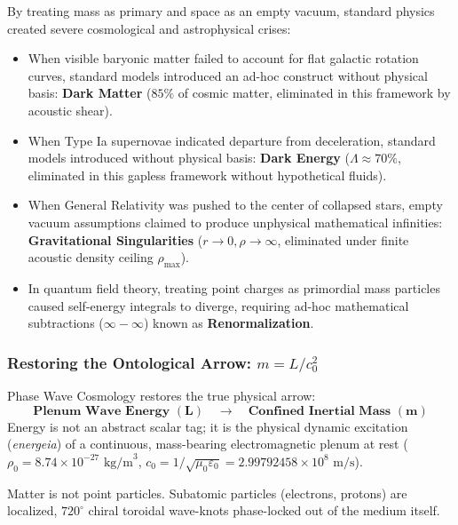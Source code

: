 \documentclass[11pt,a4paper]{article}
\begin{document}
By treating mass as primary and space as an empty vacuum, standard physics created severe cosmological and astrophysical crises:
\begin{itemize}
    \item When visible baryonic matter failed to account for flat galactic rotation curves, standard models introduced an ad-hoc construct without physical basis: \textbf{Dark Matter} ($85\%$ of cosmic matter, eliminated in this framework by acoustic shear).
    \item When Type Ia supernovae indicated departure from deceleration, standard models introduced without physical basis: \textbf{Dark Energy} ($\Lambda \approx 70\%$, eliminated in this gapless framework without hypothetical fluids).
    \item When General Relativity was pushed to the center of collapsed stars, empty vacuum assumptions claimed to produce unphysical mathematical infinities: \textbf{Gravitational Singularities} ($r \to 0, \rho \to \infty$, eliminated under finite acoustic density ceiling $\rho_{\max}$).
    \item In quantum field theory, treating point charges as primordial mass particles caused self-energy integrals to diverge, requiring ad-hoc mathematical subtractions ($\infty - \infty$) known as \textbf{Renormalization}.
\end{itemize}

\subsubsection{Restoring the Ontological Arrow: \texorpdfstring{$m = L/c_0^2$}{m = L/c0\textasciicircum 2}}

Phase Wave Cosmology restores the true physical arrow:
\begin{equation}
\mathbf{\text{Plenum Wave Energy } (L) \quad \longrightarrow \quad \text{Confined Inertial Mass } (m)}
\end{equation}
Energy is not an abstract scalar tag; it is the physical dynamic excitation (\textit{energeia}) of a continuous, mass-bearing electromagnetic plenum at rest ($\rho_0 = 8.74 \times 10^{-27}\text{ kg/m}^3$, $c_0 = 1/\sqrt{\mu_0\varepsilon_0} = 2.99792458 \times 10^8\text{ m/s}$).

Matter is not point particles. Subatomic particles (electrons, protons) are localized, $720^\circ$ chiral toroidal wave-knots phase-locked out of the medium itself.
\end{document}
